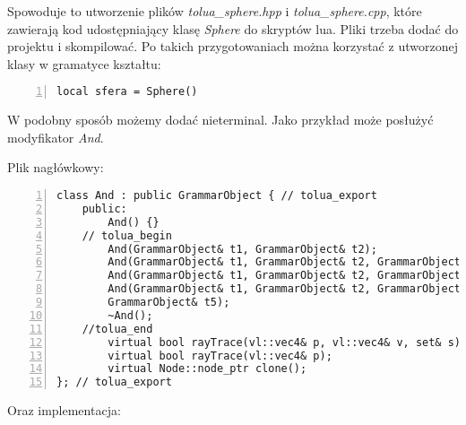 Spowoduje to utworzenie plików {\em tolua\_sphere.hpp} i {\em
tolua\_sphere.cpp}, które zawierają kod udostępniający klasę {\em Sphere} do
skryptów lua. Pliki trzeba dodać do projektu i skompilować. Po takich
przygotowaniach można korzystać z utworzonej klasy w gramatyce kształtu:
{
\small
\begin{lstlisting}[numbers=left,frame=single,numberstyle=\tiny,backgroundcolor=\color{code_back},breaklines=true]
local sfera = Sphere()
\end{lstlisting}
}

W podobny sposób możemy dodać nieterminal. Jako przykład może posłużyć
modyfikator \emph{And}.

Plik nagłówkowy:

{
\small
\begin{lstlisting}[numbers=left,frame=single,numberstyle=\tiny,backgroundcolor=\color{code_back},breaklines=true]
class And : public GrammarObject { // tolua_export
    public:
        And() {}
    // tolua_begin
        And(GrammarObject& t1, GrammarObject& t2);
        And(GrammarObject& t1, GrammarObject& t2, GrammarObject& t3);
        And(GrammarObject& t1, GrammarObject& t2, GrammarObject& t3, GrammarObject& t4);
        And(GrammarObject& t1, GrammarObject& t2, GrammarObject& t3, GrammarObject& t4, 
        GrammarObject& t5);
        ~And();
    //tolua_end
        virtual bool rayTrace(vl::vec4& p, vl::vec4& v, set& s);
        virtual bool rayTrace(vl::vec4& p);
        virtual Node::node_ptr clone();
}; // tolua_export
\end{lstlisting}
}

Oraz implementacja:

